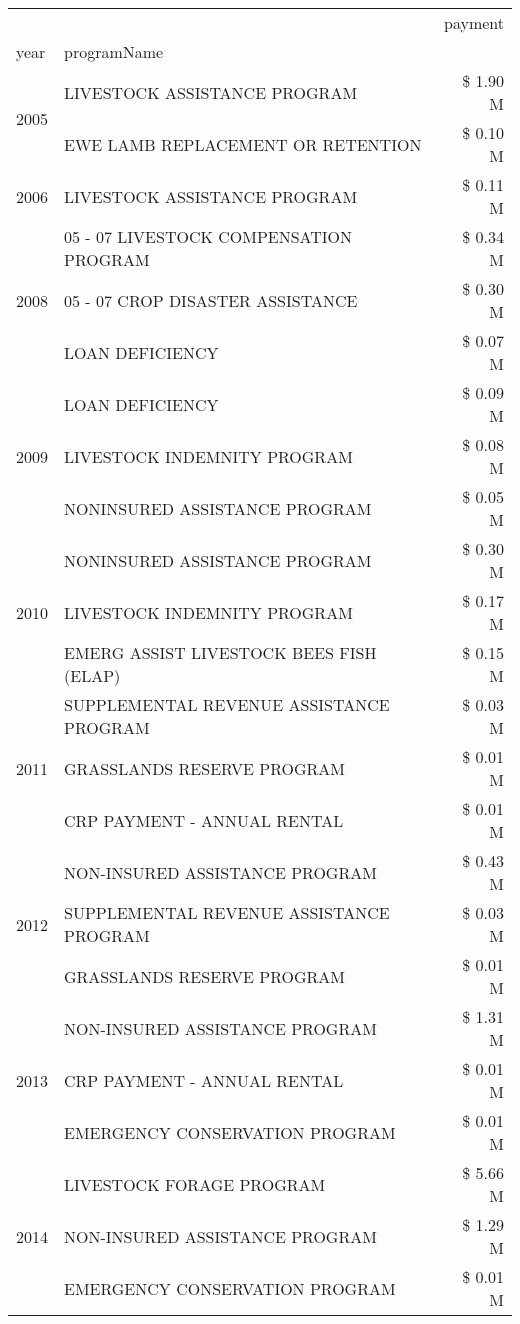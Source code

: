 \begin{tabular}{llr}
\toprule
 &  & payment \\
year & programName &  \\
\midrule
\multirow[t]{2}{*}{2005} & LIVESTOCK ASSISTANCE PROGRAM & \$ 1.90 M \\
 & EWE LAMB REPLACEMENT OR RETENTION & \$ 0.10 M \\
\cline{1-3}
2006 & LIVESTOCK ASSISTANCE PROGRAM & \$ 0.11 M \\
\cline{1-3}
\multirow[t]{3}{*}{2008} & 05 - 07 LIVESTOCK COMPENSATION PROGRAM & \$ 0.34 M \\
 & 05 - 07 CROP DISASTER ASSISTANCE & \$ 0.30 M \\
 & LOAN DEFICIENCY & \$ 0.07 M \\
\cline{1-3}
\multirow[t]{3}{*}{2009} & LOAN DEFICIENCY & \$ 0.09 M \\
 & LIVESTOCK INDEMNITY PROGRAM & \$ 0.08 M \\
 & NONINSURED ASSISTANCE PROGRAM & \$ 0.05 M \\
\cline{1-3}
\multirow[t]{3}{*}{2010} & NONINSURED ASSISTANCE PROGRAM & \$ 0.30 M \\
 & LIVESTOCK INDEMNITY PROGRAM & \$ 0.17 M \\
 & EMERG ASSIST LIVESTOCK BEES FISH (ELAP) & \$ 0.15 M \\
\cline{1-3}
\multirow[t]{3}{*}{2011} & SUPPLEMENTAL REVENUE ASSISTANCE PROGRAM & \$ 0.03 M \\
 & GRASSLANDS RESERVE PROGRAM & \$ 0.01 M \\
 & CRP PAYMENT - ANNUAL RENTAL & \$ 0.01 M \\
\cline{1-3}
\multirow[t]{3}{*}{2012} & NON-INSURED ASSISTANCE PROGRAM & \$ 0.43 M \\
 & SUPPLEMENTAL REVENUE ASSISTANCE PROGRAM & \$ 0.03 M \\
 & GRASSLANDS RESERVE PROGRAM & \$ 0.01 M \\
\cline{1-3}
\multirow[t]{3}{*}{2013} & NON-INSURED ASSISTANCE PROGRAM & \$ 1.31 M \\
 & CRP PAYMENT - ANNUAL RENTAL & \$ 0.01 M \\
 & EMERGENCY CONSERVATION PROGRAM & \$ 0.01 M \\
\cline{1-3}
\multirow[t]{3}{*}{2014} & LIVESTOCK FORAGE PROGRAM & \$ 5.66 M \\
 & NON-INSURED ASSISTANCE PROGRAM & \$ 1.29 M \\
 & EMERGENCY CONSERVATION PROGRAM & \$ 0.01 M \\

\end{tabular}
